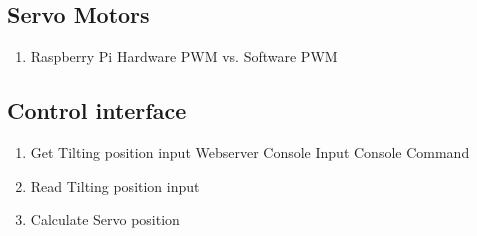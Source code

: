 \subsection{Servo Motors}

\begin{enumerate}
  \item Raspberry Pi Hardware PWM vs. Software PWM
\end{enumerate}

\subsection{Control interface}

\begin{enumerate}
  \item Get Tilting position input
  \subitem Webserver
  \subitem Console Input
  \subitem Console Command
  \item Read Tilting position input
  \item Calculate Servo position
\end{enumerate}
